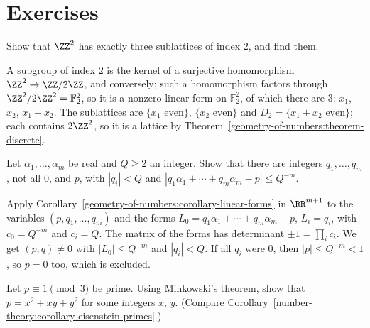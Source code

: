 \section{Exercises}\label{geometry-of-numbers:section-exercises}

\begin{exercise}\label{geometry-of-numbers:exercise-index-two}
Show that $\ZZ^2$ has exactly three sublattices of index $2$, and find them.
\end{exercise}

\begin{solution}
A subgroup of index $2$ is the kernel of a surjective homomorphism $\ZZ^2 \to \ZZ/2\ZZ$, and conversely; such a homomorphism factors through $\ZZ^2/2\ZZ^2 = \mathbb{F}_2^2$, so it is a nonzero linear form on
$\mathbb{F}_2^2$, of which there are $3$: $x_1$, $x_2$, $x_1 + x_2$. The sublattices are $\{x_1 \text{ even}\}$, $\{x_2 \text{ even}\}$ and $D_2 = \{x_1 + x_2 \text{ even}\}$; each contains $2\ZZ^2$, so it is a
lattice by Theorem~\ref{geometry-of-numbers:theorem-discrete}.
\end{solution}

\begin{exercise}\label{geometry-of-numbers:exercise-dual-dirichlet}
Let $\alpha_1, \ldots, \alpha_m$ be real and $Q \geq 2$ an integer. Show that there are integers $q_1, \ldots, q_m$, not all $0$, and $p$, with $|q_i| < Q$ and
$|q_1\alpha_1 + \cdots + q_m\alpha_m - p| \leq Q^{-m}$.
\end{exercise}

\begin{solution}
Apply Corollary~\ref{geometry-of-numbers:corollary-linear-forms} in $\RR^{m+1}$ to the variables $(p, q_1, \ldots, q_m)$ and the forms $L_0 = q_1\alpha_1 + \cdots + q_m\alpha_m - p$, $L_i = q_i$, with
$c_0 = Q^{-m}$ and $c_i = Q$. The matrix of the forms has determinant $\pm1 = \prod_ic_i$. We get $(p, q) \neq 0$ with $|L_0| \leq Q^{-m}$ and $|q_i| < Q$. If all $q_i$ were $0$, then $|p| \leq Q^{-m} < 1$,
so $p = 0$ too, which is excluded.
\end{solution}

\begin{exercise}\label{geometry-of-numbers:exercise-eisenstein-minkowski}
Let $p \equiv 1 \pmod 3$ be prime. Using Minkowski's theorem, show that $p = x^2 + xy + y^2$ for some integers $x$, $y$. (Compare Corollary~\ref{number-theory:corollary-eisenstein-primes}.)
\end{exercise}

